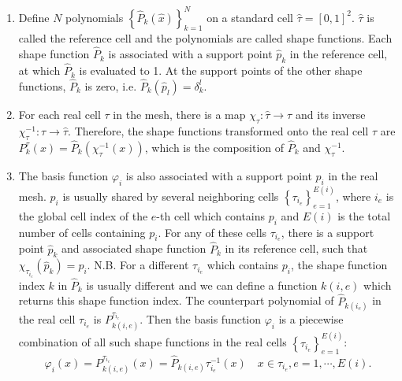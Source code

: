 \documentclass[11pt, a4paper]{book}
\begin{document}
\begin{enumerate}
\item Define $N$ polynomials $\left\{ \hat{P}_k(\hat{x}) \right\}_{k=1}^N$ on a standard
  cell $\hat{\tau}=[0,1]^2$. $\hat{\tau}$ is called the reference cell and the polynomials
  are called shape functions. Each shape function $\hat{P}_k$ is associated with a support
  point $\hat{p}_k$ in the reference cell, at which $\hat{P}_k$ is evaluated to 1. At the
  support points of the other shape functions, $\hat{P}_k$ is zero, i.e.
  $\hat{P}_k(\hat{p}_{l}) = \delta_k^l$.
\item For each real cell $\tau$ in the mesh, there is a map
  $\chi_{\tau}: \hat{\tau} \rightarrow \tau$ and its inverse
  $\chi_{\tau}^{-1}: \tau \rightarrow \hat{\tau}$. Therefore, the shape functions
  transformed onto the real cell $\tau$ are
  $P_k^{\tau}(x) = \hat{P}_k(\chi_{\tau}^{-1}(x))$, which is the composition of
  $\hat{P}_k$ and $\chi_{\tau}^{-1}$.
\item The basis function $\varphi_i$ is also associated with a support point $p_i$ in the
  real mesh. $p_i$ is usually shared by several neighboring cells
  $\left\{ \tau_{i_{e}} \right\}_{e=1}^{E(i)}$, where $i_e$ is the global cell index of
  the $e$-th cell which contains $p_i$ and $E(i)$ is the total number of cells containing
  $p_i$. For any of these cells $\tau_{i_e}$, there is a support point $\hat{p}_k$ and
  associated shape function $\hat{P}_k$ in its reference cell, such that
  $\chi_{\tau_{i_e}}(\hat{p}_k) = p_i$. N.B. For a different $\tau_{i_e}$ which contains
  $p_i$, the shape function index $k$ in $\hat{P}_k$ is usually different and we can
  define a function $k(i, e)$ which returns this shape function index. The counterpart
  polynomial of $\hat{P}_{k(i_e)}$ in the real cell $\tau_{i_e}$ is
  $P_{k(i, e)}^{\tau_{i_e}}$. Then the basis function $\varphi_i$ is a piecewise
  combination of all such shape functions in the real cells
  $\left\{ \tau_{i_e} \right\}_{e=1}^{E(i)}$:
  \begin{equation}
    \label{eq:basis-function-from-shape-functions}
    \varphi_i(x) = P_{k(i,e)}^{\tau_{i_e}}(x) = \hat{P}_{k(i,e)}\tau_{i_e}^{-1}(x) \quad x\in\tau_{i_e}, e=1,\cdots,E(i).
  \end{equation}
\end{enumerate}
\end{document}
